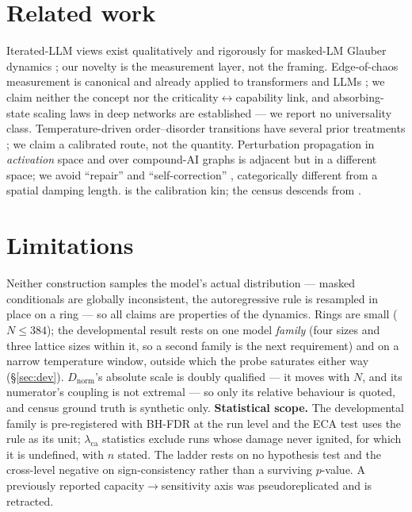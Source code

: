 \documentclass{article}
\newcommand{\dn}{\ensuremath{D_{\mathrm{norm}}}}
\newcommand{\lca}{\ensuremath{\lambda_{\mathrm{ca}}}}
\begin{document}
\section{Related work}
Iterated-LLM views exist qualitatively \citep{logos_ca,telephone,paraphrase2cycle} and rigorously
for masked-LM Glauber dynamics \citep{glauber_mlm}; our novelty is the measurement layer, not the
framing. Edge-of-chaos measurement is canonical \citep{langton1990computation,bertschinger2004real} and
already applied to transformers \citep{lyap_selfattn} and LLMs \citep{edgeofchaos2024,qle}; we
claim neither the concept nor the criticality$\leftrightarrow$capability link, and
absorbing-state scaling laws in deep networks are established \citep{tamai_dp} --- we report no
universality class. Temperature-driven order--disorder transitions have several prior
treatments \citep{critical_temp,critical_temp2,critical_temp3,ar_tempcrit,phase_detect}; we claim
a calibrated route, not the quantity. Perturbation propagation in \emph{activation} space
\citep{sparc,tft,residual_dynamics} and over compound-AI graphs \citep{quiver} is adjacent but in
a different space; we avoid ``repair'' \citep{hydra,selfrepair} and ``self-correction''
\citep{sparc}, categorically different from a spatial damping length. \citet{sampler_oracle} is
the calibration kin; the census descends from \citet{hanson1997computational}.

\section{Limitations}
Neither construction samples the model's actual distribution --- masked conditionals are
globally inconsistent, the autoregressive rule is resampled in place on a ring --- so all claims
are properties of the dynamics. Rings are small ($N\le384$); the
developmental result rests on one model \emph{family} (four sizes and three lattice sizes within
it, so a second family is the next requirement) and on a narrow temperature window, outside which
the probe saturates either way (\S\ref{sec:dev}). \dn{}'s absolute scale is doubly qualified ---
it moves with $N$, and its numerator's coupling is not extremal --- so only its relative behaviour
is quoted, and census ground truth is synthetic only. \textbf{Statistical scope.} The developmental family is
pre-registered with BH-FDR at the run level and the ECA test uses the rule as its unit; $\lca$
statistics exclude runs whose damage never ignited, for which it is undefined, with $n$ stated.
The ladder rests on no hypothesis test and the cross-level negative on sign-consistency rather
than a surviving $p$-value. A previously reported capacity$\to$sensitivity axis was
pseudoreplicated and is retracted.
\end{document}
